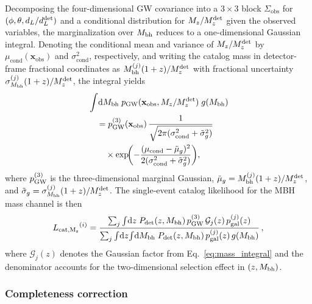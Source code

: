 Decomposing the four-dimensional GW covariance into a $3\times 3$ block
$\Sigma_\mathrm{obs}$ for $(\phi, \theta, d_L/d_L^\mathrm{det})$ and a
conditional distribution for $M_z/M_z^\mathrm{det}$ given the observed
variables, the marginalization over $M_\mathrm{bh}$ reduces to a one-dimensional
Gaussian integral.  Denoting the conditional mean and variance
of $M_z/M_z^\mathrm{det}$ by $\mu_\mathrm{cond}(\mathbf{x}_\mathrm{obs})$
and $\sigma^2_\mathrm{cond}$, respectively, and writing the catalog mass in
detector-frame fractional coordinates as
$M_\mathrm{bh}^{(j)}(1+z)/M_z^\mathrm{det}$ with fractional uncertainty
$\sigma_{M_\mathrm{bh}}^{(j)}(1+z)/M_z^\mathrm{det}$, the integral yields
\begin{align}
  &\int\!\mathrm{d}M_\mathrm{bh} \;p_\mathrm{GW}(\mathbf{x}_\mathrm{obs}, M_z/M_z^\mathrm{det})
  \;g(M_\mathrm{bh})
  \nonumber\\
  &\quad = p_\mathrm{GW}^{(3)}(\mathbf{x}_\mathrm{obs})\,
  \frac{1}{\sqrt{2\pi(\sigma^2_\mathrm{cond} + \tilde{\sigma}_g^2)}}
  \nonumber\\
  &\qquad \times \exp\!\biggl(
    -\frac{(\mu_\mathrm{cond} - \tilde{\mu}_g)^2}
    {2(\sigma^2_\mathrm{cond} + \tilde{\sigma}_g^2)}
  \biggr) ,
  \label{eq:mass_integral}
\end{align}
where $p_\mathrm{GW}^{(3)}$ is the three-dimensional marginal Gaussian,
$\tilde{\mu}_g = M_\mathrm{bh}^{(j)}(1+z)/M_z^\mathrm{det}$, and
$\tilde{\sigma}_g = \sigma_{M_\mathrm{bh}}^{(j)}(1+z)/M_z^\mathrm{det}$.
The single-event catalog likelihood for the MBH mass channel is then
\begin{equation}
  {L_\mathrm{cat,\Mz}}^{(i)} = \frac{%
    \sum_j \int\!\mathrm{d}z\;
    \pdet(z,\Mbh)\,
    \pGW^{(3)}\, \mathcal{G}_j(z)\,
    \pgal^{(j)}(z)
  }{%
    \sum_j \int\!\mathrm{d}z\!\int\!\mathrm{d}\Mbh\;
    \pdet(z,\Mbh)\,\pgal^{(j)}(z)\,g(\Mbh)
  } \,,
  \label{eq:Lcat_mass}
\end{equation}
where $\mathcal{G}_j(z)$ denotes the Gaussian factor from
Eq.~\eqref{eq:mass_integral} and the denominator accounts for the
two-dimensional selection effect in $(z, M_\mathrm{bh})$.

\subsubsection{Completeness correction}

